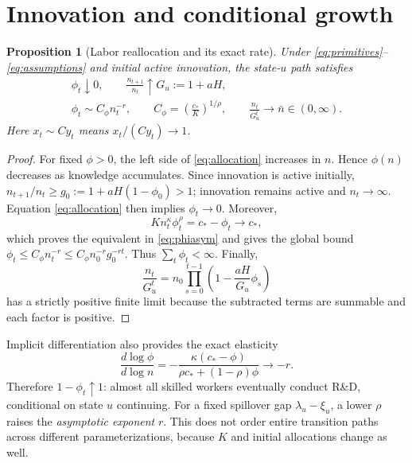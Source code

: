 \documentclass[11pt,a4paper]{article}
\newtheorem{proposition}{Proposition}
\newcommand{\asym}{\sim}
\begin{document}
\section{Innovation and conditional growth}
\begin{proposition}[Labor reallocation and its exact rate]
Under \eqref{eq:primitives}--\eqref{eq:assumptions} and initial active innovation,
the state-$u$ path satisfies
\begin{gather}
\phi_t\downarrow0,\qquad
\frac{n_{t+1}}{n_t}\uparrow G_u:=1+aH,\label{eq:growth}\\
\phi_t\asym C_\phi n_t^{-r},\qquad
C_\phi=\left(\frac{c_*}{K}\right)^{1/\rho},\qquad
\frac{n_t}{G_u^t}\longrightarrow\bar n\in(0,\infty).\label{eq:phiasym}
\end{gather}
Here $x_t\asym C y_t$ means $x_t/(Cy_t)\to1$.
\end{proposition}
\begin{proof}
For fixed $\phi>0$, the left side of \eqref{eq:allocation} increases in $n$.
Hence $\phi(n)$ decreases as knowledge accumulates. Since innovation is active
initially, $n_{t+1}/n_t\geq g_0:=1+aH(1-\phi_0)>1$; innovation remains active
and $n_t\to\infty$. Equation \eqref{eq:allocation} then implies $\phi_t\to0$.
Moreover,
\begin{equation}
Kn_t^\kappa\phi_t^\rho=c_*-\phi_t\longrightarrow c_*,
\end{equation}
which proves the equivalent in \eqref{eq:phiasym} and gives the global bound
$\phi_t\leq C_\phi n_t^{-r}\leq C_\phi n_0^{-r}g_0^{-rt}$. Thus
$\sum_t\phi_t<\infty$. Finally,
\begin{equation}
\frac{n_t}{G_u^t}
=n_0\prod_{s=0}^{t-1}\left(1-\frac{aH}{G_u}\phi_s\right)
\end{equation}
has a strictly positive finite limit because the subtracted terms are summable
and each factor is positive.
\end{proof}
Implicit differentiation also provides the exact elasticity
\begin{equation}
\boxed{\frac{d\log\phi}{d\log n}
=-\frac{\kappa(c_*-\phi)}{\rho c_*+(1-\rho)\phi}
\longrightarrow-r.}\label{eq:elasticity}
\end{equation}
Therefore $1-\phi_t\uparrow1$: almost all skilled workers eventually conduct
R\&D, conditional on state $u$ continuing. For a fixed spillover gap
$\lambda_u-\xi_u$, a lower $\rho$ raises the \emph{asymptotic exponent} $r$.
This does not order entire transition paths across different parameterizations,
because $K$ and initial allocations change as well.
\end{document}
